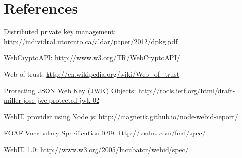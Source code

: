 \section{References}\label{references}

Distributed private key management:
\url{http://individual.utoronto.ca/aldar/paper/2012/dpkg.pdf}

WebCryptoAPI: \url{http://www.w3.org/TR/WebCryptoAPI/}

Web of trust: \url{http://en.wikipedia.org/wiki/Web_of_trust}

Protecting JSON Web Key (JWK) Objects:
\url{http://tools.ietf.org/html/draft-miller-jose-jwe-protected-jwk-02}

WebID provider using Node.js:
\url{http://magnetik.github.io/node-webid-report/}

FOAF Vocabulary Specification 0.99: \url{http://xmlns.com/foaf/spec/}

WebID 1.0: \url{http://www.w3.org/2005/Incubator/webid/spec/}
